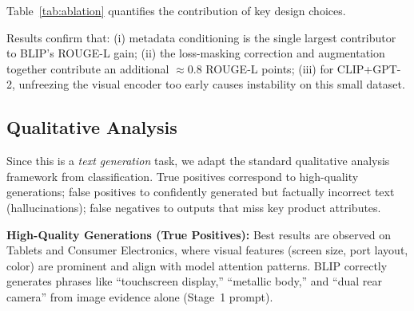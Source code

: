 \documentclass[12pt,a4paper]{article}
\begin{document}
Table~\ref{tab:ablation} quantifies the contribution of key design choices.

\begin{table}[H]
\centering
\caption{Ablation results --- single best-epoch checkpoint evaluated on the test set.}
\label{tab:ablation}
\end{table}

Results confirm that: (i) metadata conditioning is the single largest contributor to
BLIP's ROUGE-L gain; (ii) the loss-masking correction and augmentation together
contribute an additional $\approx$0.8 ROUGE-L points; (iii) for CLIP+GPT-2, unfreezing
the visual encoder too early causes instability on this small dataset.

\subsection{Qualitative Analysis}

Since this is a \emph{text generation} task, we adapt the standard qualitative analysis
framework from classification. True positives correspond to high-quality generations;
false positives to confidently generated but factually incorrect text (hallucinations);
false negatives to outputs that miss key product attributes.

\textbf{High-Quality Generations (True Positives):} Best results are observed on
Tablets and Consumer Electronics, where visual features (screen size, port layout,
color) are prominent and align with model attention patterns. BLIP correctly generates
phrases like ``touchscreen display,'' ``metallic body,'' and ``dual rear camera'' from
image evidence alone (Stage~1 prompt).
\end{document}
